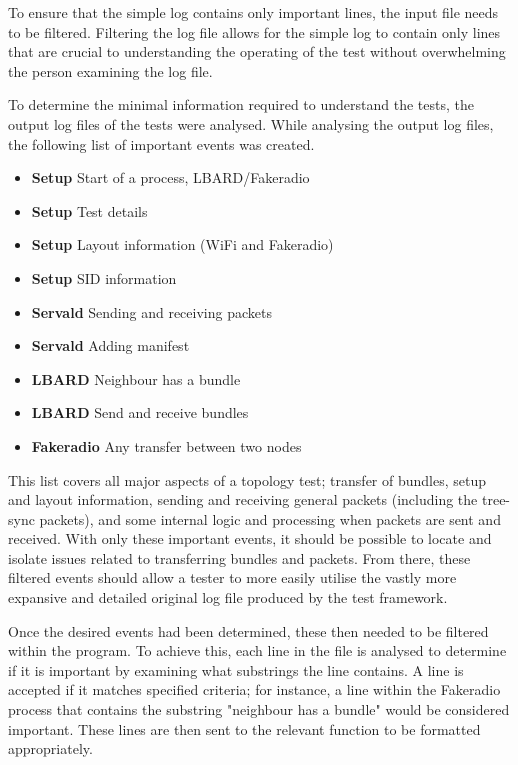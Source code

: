 To ensure that the simple log contains only important lines, the input file needs to be filtered.
Filtering the log file allows for the simple log to contain only lines that are crucial to understanding the operating of the test without overwhelming the person examining the log file.

To determine the minimal information required to understand the tests, the output log files of the tests were analysed.
While analysing the output log files, the following list of important events was created.
\begin{itemize}
    \item \textbf{Setup} Start of a process, LBARD/Fakeradio
    \item \textbf{Setup} Test details
    \item \textbf{Setup} Layout information (WiFi and Fakeradio)
    \item \textbf{Setup} SID information
    \item \textbf{Servald} Sending and receiving packets
    \item \textbf{Servald} Adding manifest
    \item \textbf{LBARD} Neighbour has a bundle
    \item \textbf{LBARD} Send and receive bundles
    \item \textbf{Fakeradio} Any transfer between two nodes
\end{itemize}
This list covers all major aspects of a topology test; transfer of bundles, setup and layout information, sending and receiving general packets (including the tree-sync packets), and some internal logic and processing when packets are sent and received.
With only these important events, it should be possible to locate and isolate issues related to transferring bundles and packets. 
From there, these filtered events should allow a tester to more easily utilise the vastly more expansive and detailed original log file produced by the test framework. 

Once the desired events had been determined, these then needed to be filtered within the program.
To achieve this, each line in the file is analysed to determine if it is important by examining what substrings the line contains.
A line is accepted if it matches specified criteria; for instance, a line within the Fakeradio process that contains the substring "neighbour has a bundle" would be considered important. 
These lines are then sent to the relevant function to be formatted appropriately.

